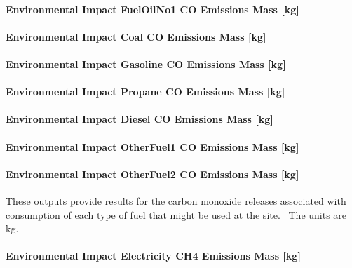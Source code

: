 \paragraph{Environmental Impact FuelOilNo1 CO Emissions Mass {[}kg{]}}\label{environmental-impact-fuel-oil-1-co-emissions-mass-kg}

\paragraph{Environmental Impact Coal CO Emissions Mass {[}kg{]}}\label{environmental-impact-coal-co-emissions-mass-kg}

\paragraph{Environmental Impact Gasoline CO Emissions Mass {[}kg{]}}\label{environmental-impact-gasoline-co-emissions-mass-kg}

\paragraph{Environmental Impact Propane CO Emissions Mass {[}kg{]}}\label{environmental-impact-propane-co-emissions-mass-kg}

\paragraph{Environmental Impact Diesel CO Emissions Mass {[}kg{]}}\label{environmental-impact-diesel-co-emissions-mass-kg}

\paragraph{Environmental Impact OtherFuel1 CO Emissions Mass {[}kg{]}}\label{environmental-impact-otherfuel1-co-emissions-mass-kg}

\paragraph{Environmental Impact OtherFuel2 CO Emissions Mass {[}kg{]}}\label{environmental-impact-otherfuel2-co-emissions-mass-kg}

These outputs provide results for the carbon monoxide releases associated with consumption of each type of fuel that might be used at the site.~ The units are kg.

\paragraph{Environmental Impact Electricity CH4 Emissions Mass {[}kg{]}}\label{environmental-impact-electricity-ch4-emissions-mass-kg}

